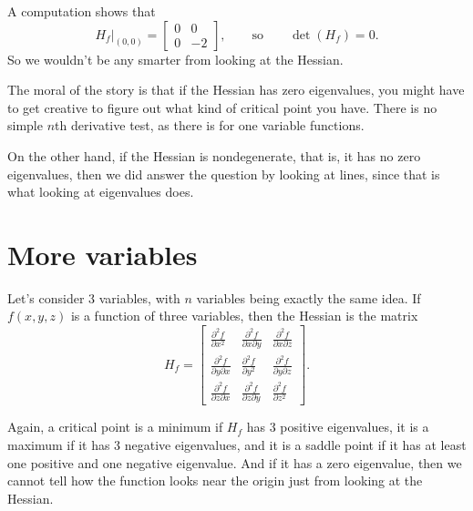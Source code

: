 \documentclass[12pt]{article}
\begin{document}
A computation shows that
\[
H_f\big|_{(0,0)} =
\begin{bmatrix}
0 & 0 \\
0 & -2
\end{bmatrix}
,
\qquad \text{so} \qquad
\det(H_f) = 0 .
\]
So we wouldn't be any smarter from looking at the Hessian.

The moral of the story is that if the Hessian has zero eigenvalues, you
might have to get creative to figure out what kind of critical point you have.
There is no simple $n$th derivative test, as there is for one variable functions.

On the other hand, if the Hessian is nondegenerate, that is, it has no
zero eigenvalues, then we did answer the question by looking at lines, since
that is what looking at eigenvalues does.

\section*{More variables}

Let's consider 3 variables, with $n$ variables being exactly the same
idea.
If $f(x,y,z)$ is a function of three variables, then
the Hessian is the matrix
\[
H_f
=
\begin{bmatrix}
\frac{\partial^2 f}{\partial x^2} &
\frac{\partial^2 f}{\partial x \partial y} &
\frac{\partial^2 f}{\partial x \partial z}
\\
\frac{\partial^2 f}{\partial y \partial x} &
\frac{\partial^2 f}{\partial y^2} &
\frac{\partial^2 f}{\partial y \partial z}
\\
\frac{\partial^2 f}{\partial z \partial x} &
\frac{\partial^2 f}{\partial z \partial y} &
\frac{\partial^2 f}{\partial z^2}
\end{bmatrix} .
\]

Again, a critical point is a minimum if $H_f$ has 3 positive eigenvalues, it
is a maximum if it has 3 negative eigenvalues, and it is a saddle point if it
has at least one positive and one negative eigenvalue.  And if it has a
zero eigenvalue, then we cannot tell how the function looks near the origin
just from looking at the Hessian.

\bigskip
\end{document}
